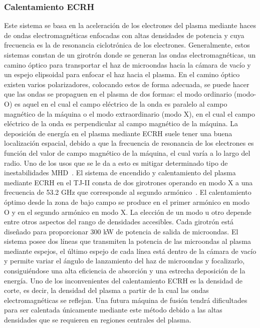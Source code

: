 \subsubsection*{Calentamiento ECRH}
Este sistema se basa en
la aceleración de los electrones del plasma mediante haces de ondas electromagnéticas enfocadas
con altas densidades de potencia y cuya frecuencia es la de resonancia ciclotrónica de
los electrones.
Generalmente, estos sistemas constan de un girotrón donde se generan las ondas electromagnéticas, 
un camino óptico para transportar el haz de microondas hacia la cámara de
vacío y un espejo elipsoidal para enfocar el haz hacia el plasma.
En el camino óptico existen varios polarizadores, colocando estos de forma adecuada, se puede hacer que las ondas se propaguen
en el plasma de dos formas: el modo ordinario (modo-O) es aquel en el cual el campo
eléctrico de la onda es paralelo al campo magnético de la máquina o el modo extraordinario
(modo X), en el cual el campo eléctrico de la onda es perpendicular al campo magnético de
la máquina. La deposición de energía en el plasma mediante ECRH suele tener una buena localización
espacial, debido a que la frecuencia de resonancia de los electrones es función del valor de
campo magnético de la máquina, el cual varía a lo largo del radio. Uno de los usos que se le
da a esto es mitigar determinado
tipo de inestabilidades MHD~\cite{van_den_Brand_2012}.
El sistema de encendido y calentamiento del plasma mediante ECRH en el TJ-II consta de
dos girotrones operando en modo X a una frecuencia de 53.2 GHz que corresponde al segundo
armónico~\cite{Fernandez2001}. El calentamiento óptimo desde la zona de bajo campo se produce en el
primer armónico en modo O y en el segundo armónico en modo X. La elección de un modo
u otro depende entre otros aspectos del rango de densidades accesibles. Cada girotrón está diseñado
para proporcionar 300 kW de potencia de salida de microondas. El sistema posee dos líneas
que transmiten la potencia de las microondas al plasma mediante espejos, el último espejo
de cada línea está dentro de la cámara de vacío y permite variar el ángulo de lanzamiento
del haz de microondas y focalizarlo, consiguiéndose una alta eficiencia de absorción y una
estrecha deposición de la energía.
Uno de los inconvenientes del calentamiento ECRH es la densidad de corte, es decir, la densidad
del plasma a partir de la cual las ondas electromagnéticas se reflejan. Una futura máquina
de fusión tendrá dificultades para ser calentada únicamente mediante este método debido a
las altas densidades que se requieren en regiones centrales del plasma.
